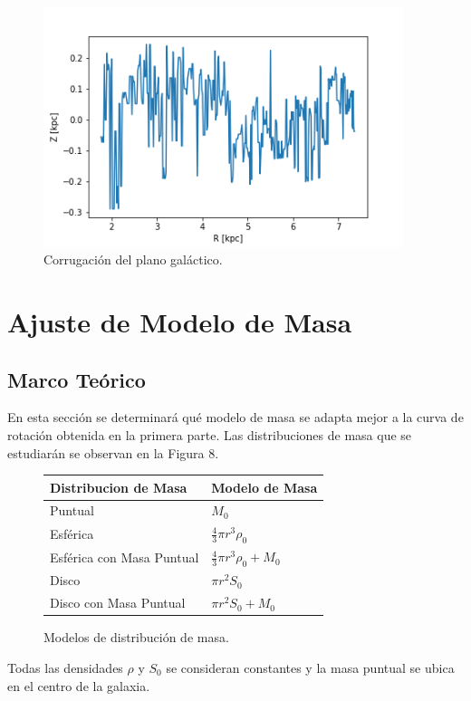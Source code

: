 \documentclass[letterpaper,oneside]{article}
\begin{document}
\begin{figure}
  \centering
  \includegraphics[height=7cm]{../graficos/corr.png}
  \caption{Corrugación del plano galáctico.}
\end{figure}

\section{Ajuste de Modelo de Masa}
\subsection{Marco Teórico}
En esta sección se determinará qué modelo de masa se adapta mejor a la curva de rotación obtenida en la primera parte. Las distribuciones de masa que se estudiarán se observan en la Figura 8.

\begin{figure}
    \begin{tabular}{| l | l|}
     \hline
    Distribucion de Masa      & Modelo de Masa  \\ \hline
    Puntual 	              &	$M_0$	\\
    Esférica                  &	$\frac{4}{3}\pi r^{3} \rho_0$	\\
    Esférica con Masa Puntual &	$\frac{4}{3}\pi r^{3} \rho_0 + M_0$	\\
    Disco       	          &	$\pi r^{2}S_0$	\\
    Disco con Masa Puntual    &	$\pi r^{2}S_0 + M_0$	\\
    \hline
    \end{tabular}
    \caption{Modelos de distribución de masa.}
\end{figure}

Todas las densidades $\rho$ y $S_0$ se consideran constantes y la masa puntual se ubica en el centro de la galaxia.\\
\end{document}
